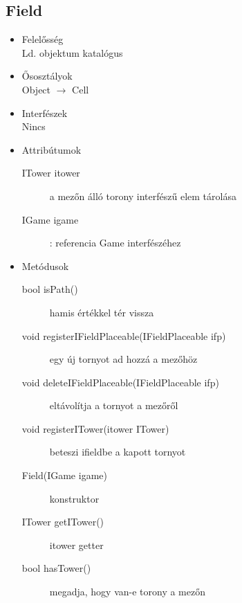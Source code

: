 \subsection{Field}
\begin{itemize}
\item Felelősség\\
Ld. objektum katalógus
\item Ősosztályok\\
Object $\rightarrow$ Cell
\item Interfészek\\
Nincs
\item Attribútumok\\
	\begin{description}
		\item[ITower itower] a mezőn álló torony interfészű elem tárolása
	\item[IGame igame]: referencia Game interfészéhez
		
	\end{description}
\item Metódusok\\
	\begin{description}
		
		\item[bool isPath()] hamis értékkel tér vissza
		\item[void registerIFieldPlaceable(IFieldPlaceable ifp)] egy új tornyot ad hozzá a mezőhöz
		\item[void deleteIFieldPlaceable(IFieldPlaceable ifp)] eltávolítja a tornyot a mezőről
		\item[void registerITower(itower ITower)] beteszi ifieldbe a kapott tornyot
		\item[Field(IGame igame)] konstruktor
		\item[ITower getITower()] itower getter
		\item[bool hasTower()] megadja, hogy van-e torony a mezőn
		
	\end{description}
\end{itemize}



